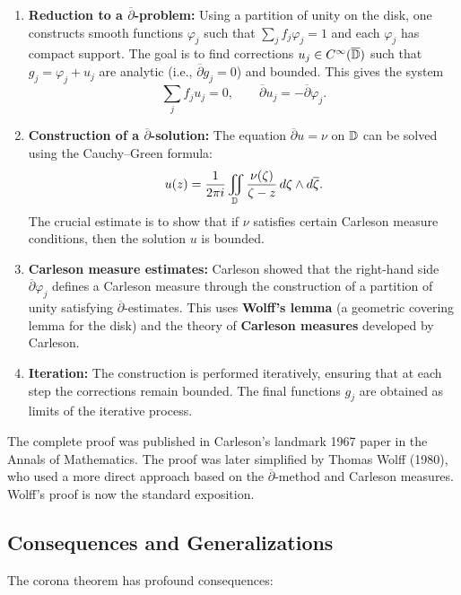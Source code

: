\begin{enumerate}
    \item \textbf{Reduction to a \(\overline{\partial}\)-problem:} Using a partition of unity on the disk, one constructs smooth functions \(\varphi_j\) such that \(\sum_j f_j \varphi_j = 1\) and each \(\varphi_j\) has compact support. The goal is to find corrections \(u_j \in C^\infty(\overline{\mathbb{D}})\) such that \(g_j = \varphi_j + u_j\) are analytic (i.e., \(\overline{\partial} g_j = 0\)) and bounded. This gives the system
    \[
    \sum_j f_j u_j = 0, \qquad \overline{\partial} u_j = -\overline{\partial} \varphi_j.
    \]
    
    \item \textbf{Construction of a \(\overline{\partial}\)-solution:} The equation \(\overline{\partial} u = \nu\) on \(\mathbb{D}\) can be solved using the Cauchy--Green formula:
    \[
    u(z) = \frac{1}{2\pi i} \iint_{\mathbb{D}} \frac{\nu(\zeta)}{\zeta - z} \,d\zeta \wedge d\overline{\zeta}.
    \]
    The crucial estimate is to show that if \(\nu\) satisfies certain Carleson measure conditions, then the solution \(u\) is bounded.
    
    \item \textbf{Carleson measure estimates:} Carleson showed that the right-hand side \(\overline{\partial} \varphi_j\) defines a Carleson measure through the construction of a partition of unity satisfying \(\overline{\partial}\)-estimates. This uses \textbf{Wolff's lemma} (a geometric covering lemma for the disk) and the theory of \textbf{Carleson measures} developed by Carleson.
    
    \item \textbf{Iteration:} The construction is performed iteratively, ensuring that at each step the corrections remain bounded. The final functions \(g_j\) are obtained as limits of the iterative process.
\end{enumerate}

The complete proof was published in Carleson's landmark 1967 paper in the Annals of Mathematics. The proof was later simplified by Thomas Wolff (1980), who used a more direct approach based on the \(\overline{\partial}\)-method and Carleson measures. Wolff's proof is now the standard exposition.

\subsection{Consequences and Generalizations}

The corona theorem has profound consequences:

